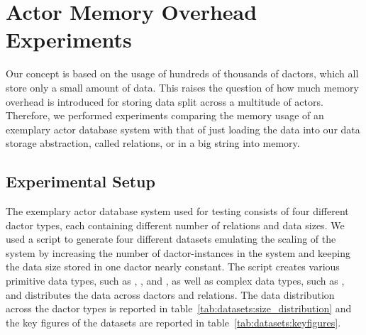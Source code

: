 
\section{Actor Memory Overhead Experiments}\label{sec:experiments}

  Our concept is based on the usage of hundreds of thousands of \glspl{dactor}, which all store only a small amount of data.
  This raises the question of how much memory overhead is introduced for storing data split across a multitude of actors.
  Therefore, we performed experiments comparing the memory usage of an exemplary actor database system with that of just loading the data into our data storage abstraction, called relations, or in a big string into memory.

\subsection{Experimental Setup}

  The exemplary actor database system used for testing consists of four different \gls{dactor} types, each containing different number of relations and data sizes.
  We used a script to generate four different datasets emulating the scaling of the system by increasing the number of \gls{dactor}-instances in the system and keeping the data size stored in one \gls{dactor} nearly constant.
  The script creates various primitive data types, such as , , and , as well as complex data types, such as , and distributes the data across \glspl{dactor} and relations.
  The data distribution across the \gls{dactor} types is reported in table~\ref{tab:datasets:size_distribution} and the key figures of the datasets are reported in table~\ref{tab:datasets:keyfigures}.
  
